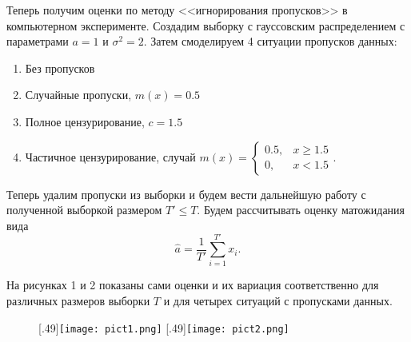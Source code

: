     Теперь получим оценки по методу <<игнорирования пропусков>> в компьютерном эксперименте. Создадим выборку с гауссовским распределением с параметрами $a = 1$ и $\sigma^2 = 2$. Затем смоделируем 4 ситуации 
    пропусков данных:
    \begin{enumerate}
        \item Без пропусков
        \item Случайные пропуски, $m(x) = 0.5$
        \item Полное цензурирование, $c = 1.5$
        \item Частичное цензурирование, случай $m(x) = \left\{
                                                        \begin{array}{ll}
                                                            0.5, & x \geq 1.5 \\
                                                            0, & x < 1.5
                                                        \end{array}\right.$.
    \end{enumerate}
    Теперь удалим пропуски из выборки и будем вести дальнейшую работу с полученной выборкой размером $T' \leq T$. Будем рассчитывать оценку 
    матожидания вида
    \begin{equation*}
        \hat{a} = \frac{1}{T'}\sum_{i=1}^{T'}x_i .
    \end{equation*}

    На рисунках 1 и 2 показаны сами оценки и их вариация соответственно для различных размеров выборки $T$ и для четырех ситуаций 
    с пропусками данных.

    \begin{figure}[ht]
        [.49\linewidth]{\texttt{[image: pict1.png]}}
        \hfill
        [.49\linewidth]{\texttt{[image: pict2.png]}}
    \end{figure}